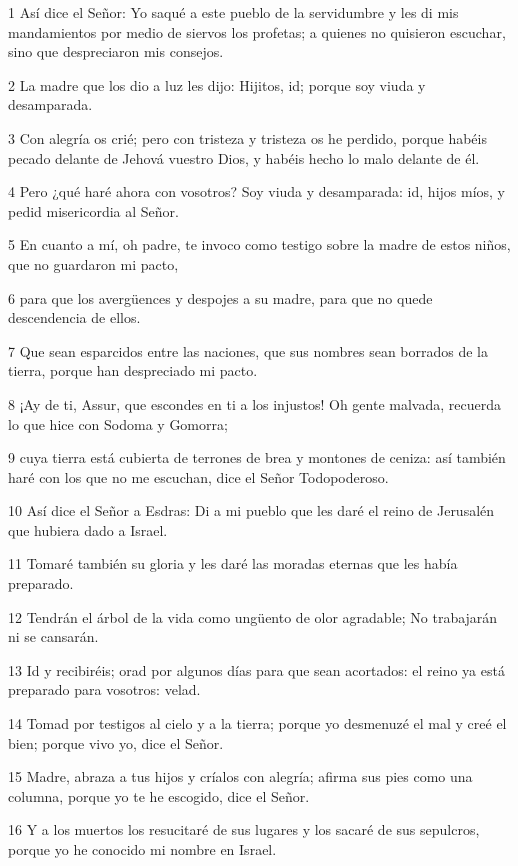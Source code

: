 \par 1 Así dice el Señor: Yo saqué a este pueblo de la servidumbre y les di mis mandamientos por medio de siervos los profetas; a quienes no quisieron escuchar, sino que despreciaron mis consejos.
\par 2 La madre que los dio a luz les dijo: Hijitos, id; porque soy viuda y desamparada.
\par 3 Con alegría os crié; pero con tristeza y tristeza os he perdido, porque habéis pecado delante de Jehová vuestro Dios, y habéis hecho lo malo delante de él.
\par 4 Pero ¿qué haré ahora con vosotros? Soy viuda y desamparada: id, hijos míos, y pedid misericordia al Señor.
\par 5 En cuanto a mí, oh padre, te invoco como testigo sobre la madre de estos niños, que no guardaron mi pacto,
\par 6 para que los avergüences y despojes a su madre, para que no quede descendencia de ellos.
\par 7 Que sean esparcidos entre las naciones, que sus nombres sean borrados de la tierra, porque han despreciado mi pacto.
\par 8 ¡Ay de ti, Assur, que escondes en ti a los injustos! Oh gente malvada, recuerda lo que hice con Sodoma y Gomorra;
\par 9 cuya tierra está cubierta de terrones de brea y montones de ceniza: así también haré con los que no me escuchan, dice el Señor Todopoderoso.
\par 10 Así dice el Señor a Esdras: Di a mi pueblo que les daré el reino de Jerusalén que hubiera dado a Israel.
\par 11 Tomaré también su gloria y les daré las moradas eternas que les había preparado.
\par 12 Tendrán el árbol de la vida como ungüento de olor agradable; No trabajarán ni se cansarán.
\par 13 Id y recibiréis; orad por algunos días para que sean acortados: el reino ya está preparado para vosotros: velad.
\par 14 Tomad por testigos al cielo y a la tierra; porque yo desmenuzé el mal y creé el bien; porque vivo yo, dice el Señor.
\par 15 Madre, abraza a tus hijos y críalos con alegría; afirma sus pies como una columna, porque yo te he escogido, dice el Señor.
\par 16 Y a los muertos los resucitaré de sus lugares y los sacaré de sus sepulcros, porque yo he conocido mi nombre en Israel.
